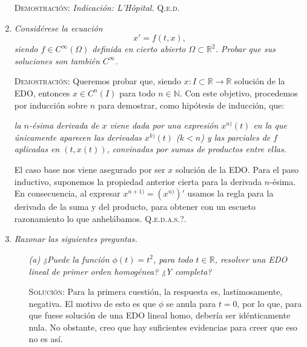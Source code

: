\documentclass{article}
\begin{document}
\begin{enumerate}
    \vspace{7px}

    \textsc{Demostración}: \textit{Indicación: L'Hôpital.} \hfill{\textsc{Q.e.d.}}

    \vspace{12px}

    \item \textit{Considérese la ecuación \[x' = f(t, x),\] siendo $f \in C^{\infty}(\Omega)$ definida en cierto abierto $\Omega \subset \mathbb{R}^2$. Probar que sus soluciones son también $C^{\infty}$.}

    \vspace{7px}

    \textsc{Demostración}: Queremos probar que, siendo $x : I \subset \mathbb{R} \rightarrow \mathbb{R}$ solución de la EDO, entonces $x \in C^n(I)$ para todo $n \in \mathbb{N}$. Con este objetivo, procedemos por inducción sobre $n$ para demostrar, como hipótesis de inducción, que:

    \begin{mdframed}
    \textit{la $n$-ésima derivada de $x$ viene dada por una expresión $x^{n)}(t)$ en la que únicamente aparecen las derivadas $x^{k)}(t)$ ($k < n$) y
     las parciales de $f$ aplicadas en $(t, x(t))$, convinadas por sumas de productos entre ellas.}
    \end{mdframed}

    El caso base nos viene asegurado por ser $x$ solución de la EDO. Para el paso inductivo, suponemos la propiedad anterior cierta para la derivada $n$-ésima. En consecuencia, al expresar $x^{n + 1)} = (x^{n)})'$ usamos la regla para la derivada de la suma y del producto, para obtener con un escueto razonamiento lo que anhelábamos. \hfill{\textsc{Q.e.d.a.s.?.}}

    \newpage

    \item \textit{Razonar las siguientes preguntas.}
    
    \begin{enumerate}
        \item[\textit{(a)}] \textit{¿Puede la función $\phi(t) = t^2$, para todo $t \in \mathbb{R}$, resolver una EDO lineal de primer orden homogénea? ¿Y completa?}

        \vspace{7px}

        \textsc{Solución}: Para la primera cuestión, la respuesta es, lastimosamente, negativa. El motivo de esto es que $\phi$ se anula para $t = 0$, por lo que, para que fuese solución de una EDO lineal homo, debería ser idénticamente nula. No obstante, creo que hay suficientes evidencias para creer que eso no es así.


\end{enumerate}
\end{enumerate}
\end{document}
